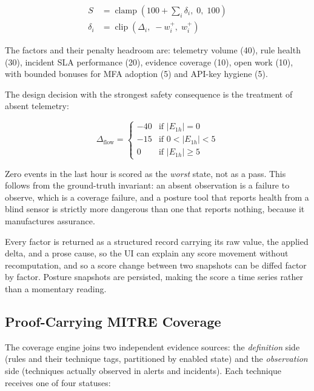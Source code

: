\documentclass[conference]{IEEEtran}
\begin{document}
\begin{align}
S &= \operatorname{clamp}\!\left(100 + \sum_{i} \delta_i,\; 0,\; 100\right) \\
\delta_i &= \operatorname{clip}\!\left(\Delta_i,\; -w_i^{+},\; w_i^{+}\right)
\end{align}

\noindent The factors and their penalty headroom are: telemetry volume (40),
rule health (30), incident SLA performance (20), evidence coverage (10),
open work (10), with bounded bonuses for MFA adoption (5) and API-key
hygiene (5).

The design decision with the strongest safety consequence is the treatment of
absent telemetry:

\begin{equation}
\Delta_{\text{flow}} = \begin{cases}
-40 & \text{if } |E_{1h}| = 0 \\
-15 & \text{if } 0 < |E_{1h}| < 5 \\
0 & \text{if } |E_{1h}| \geq 5
\end{cases}
\end{equation}

\noindent Zero events in the last hour is scored as the \emph{worst} state,
not as a pass. This follows from the ground-truth invariant: an absent
observation is a failure to observe, which is a coverage failure, and a
posture tool that reports health from a blind sensor is strictly more
dangerous than one that reports nothing, because it manufactures assurance.

Every factor is returned as a structured record carrying its raw value, the
applied delta, and a prose cause, so the UI can explain any score movement
without recomputation, and so a score change between two snapshots can be
diffed factor by factor. Posture snapshots are persisted, making the score a
time series rather than a momentary reading.

\subsection{Proof-Carrying MITRE Coverage}

The coverage engine joins two independent evidence sources: the \emph{definition}
side (rules and their technique tags, partitioned by enabled state) and the
\emph{observation} side (techniques actually observed in alerts and
incidents). Each technique receives one of four statuses:
\end{document}

